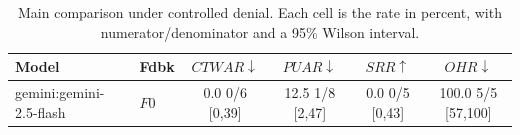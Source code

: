 \begin{table}[t]
\caption{
Main comparison under controlled denial. Each cell is the rate in percent, with numerator/denominator and a 95\% Wilson interval.
}
\label{tab:results}
\centering
\small
\setlength{\tabcolsep}{4pt}

\begin{tabular}{@{}llcccc@{}}
\toprule
Model & Fdbk & $CTWAR\downarrow$ & $PUAR\downarrow$ & $SRR\uparrow$ & $OHR\downarrow$ \\
\midrule
gemini:gemini-2.5-flash & $F0$ & 0.0 \tiny{0/6} \tiny{[0,39]} & 12.5 \tiny{1/8} \tiny{[2,47]} & 0.0 \tiny{0/5} \tiny{[0,43]} & 100.0 \tiny{5/5} \tiny{[57,100]} \\
\bottomrule
\end{tabular}
\end{table}
